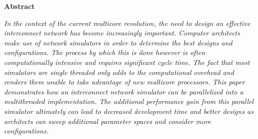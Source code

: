 \documentclass{article}
\begin{document}
\begin{multicols}{2}
\begin{center}
\Large{\bf Abstract}
\end{center}
\emph{In the context of the current multicore revolution, the need to
design an effective interconnect network has become increasingly
important.  Computer architects make use of network simulators in order to
determine the best designs and configurations.  The process by which this
is done however is often computationally intensive and requires
significant cycle time.  The fact that most simulators are single threaded
only adds to the computational overhead and renders them unable to take
advantage of new multicore processors.  This paper demonstrates how
an interconnect network simulator can be parallelized into a multithreaded
implementation.  The additional
performance gain from this parallel simulator ultimately can lead to decreased
development time and better designs as architects can sweep additional
parameter spaces and consider more configurations.}

\end{multicols}
\end{document}
